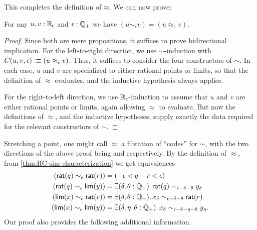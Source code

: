 This completes the definition of $\mathord\approx$.
We can now prove:

\begin{thm}\label{thm:RC-sim-characterization}
  For any $u,v:\mathbb{R}_\mathsf{c}$ and $\epsilon:\mathbb{Q}_{+}$ we have $(u\sim_\epsilon v) = (u\approx_\epsilon v)$.
\end{thm}
\begin{proof}
  Since both are mere propositions, it suffices to prove bidirectional implication.
  For the left-to-right direction, we use $\sim$-induction with $C(u,v,\epsilon)\vcentcolon\equiv (u\approx_\epsilon v)$.
  Thus, it suffices to consider the four constructors of $\sim$.
  In each case, $u$ and $v$ are specialized to either rational points or limits, so that the definition of $\approx$ evaluates, and the inductive hypothesis always applies.

  For the right-to-left direction, we use $\mathbb{R}_\mathsf{c}$-induction to assume that $u$ and $v$ are either rational points or limits, again allowing $\approx$ to evaluate.
  But now the definitions of $\approx$, and the inductive hypotheses, supply exactly the data required for the relevant constructors of $\sim$.
\end{proof}

Stretching a point, one might call $\approx$ a fibration of ``codes'' for $\sim$, with the two directions of the above proof being \encode and \decode respectively.
By the definition of $\approx$, from \autoref{thm:RC-sim-characterization} we get equivalences
\begin{align*}
  (\rcrat(q) \sim_\epsilon \rcrat(r))  &=
  (-\epsilon < q - r < \epsilon)\\
  (\rcrat(q) \sim_\epsilon \rclim(y)) &=
  \exis{\delta, \theta : \Qp} \rcrat(q) \sim_{\epsilon - \delta - \theta} y_\delta\\
  (\rclim(x) \sim_\epsilon \rcrat(r)) &=
  \exis{\delta, \theta : \Qp} x_\delta \sim_{\epsilon - \delta - \theta} \rcrat(r)\\
  (\rclim(x) \sim_\epsilon \rclim(y)) &=
  \exis{\delta, \eta, \theta : \Qp} x_\delta \sim_{\epsilon - \delta - \eta - \theta} y_\eta.
\end{align*}
Our proof also provides the following additional information.

